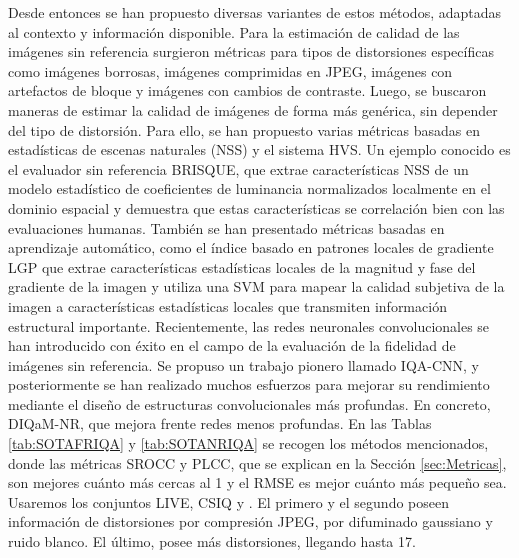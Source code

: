 Desde entonces se han propuesto diversas variantes de estos métodos, adaptadas 
al contexto y información disponible. 
Para la estimación de calidad de las imágenes sin referencia surgieron métricas para 
tipos de distorsiones específicas como 
imágenes borrosas\cite{GradientBasedBlurAssessment}, 
imágenes comprimidas en JPEG\cite{JPEGBasedOnLuminance}, 
imágenes con artefactos de bloque\cite{DeblockedImages} y imágenes con 
cambios de contraste\cite{ContrastDistorted}.
Luego, se buscaron maneras de estimar la calidad de imágenes de forma más genérica, 
sin depender del tipo de distorsión. Para ello, se han propuesto varias métricas 
basadas en estadísticas de escenas naturales (NSS) y el sistema HVS. 
Un ejemplo conocido es el evaluador sin referencia BRISQUE\cite{BRISQUE}, que extrae 
características NSS de un modelo estadístico de coeficientes de luminancia 
normalizados localmente en el dominio espacial y demuestra que estas características 
se correlación bien con las evaluaciones humanas.
También se han presentado métricas basadas en aprendizaje automático, 
como el índice basado en patrones locales de gradiente LGP\cite{LGP} que extrae 
características estadísticas locales de la magnitud y fase del gradiente de la imagen y utiliza una 
SVM para mapear la calidad subjetiva de la imagen a 
características estadísticas locales que transmiten información estructural importante.
Recientemente, las redes neuronales convolucionales se han introducido con 
éxito en el campo de la evaluación de la fidelidad de imágenes sin referencia. 
Se propuso un trabajo pionero llamado IQA-CNN\cite{IQA-CNN}, 
y posteriormente se han realizado muchos esfuerzos para mejorar su rendimiento 
mediante el diseño de estructuras convolucionales más profundas. En concreto,
DIQaM-NR\cite{DIQaM}, que mejora frente redes menos profundas.
En las Tablas \ref{tab:SOTAFRIQA} y \ref{tab:SOTANRIQA} se recogen los 
métodos mencionados, donde las métricas SROCC y PLCC, que se explican 
en la Sección \ref{sec:Metricas}, son mejores cuánto más cercas al 1 y 
el RMSE es mejor cuánto más pequeño sea.  Usaremos los conjuntos 
LIVE\cite{LIVE, LIVE1, SSIM}, CSIQ\cite{CSIQ} y \cite{TID2008}. El primero y el segundo poseen información de distorsiones por compresión JPEG, por difuminado gaussiano y ruido blanco. El último, posee más distorsiones, llegando hasta 17.

